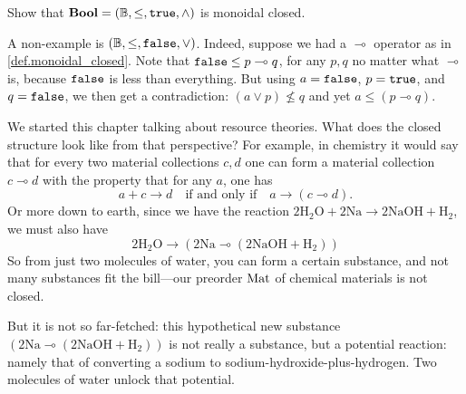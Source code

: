 \documentclass[7Sketches]{subfiles}
\begin{document}
\begin{exercise}%
\label{exc.Bool_monoidal_closed}%
%
Show that $\mathbf{Bool}=(\mathbb{B},\leq,\mathtt{true},\wedge)$ is monoidal closed.
\end{exercise}

\begin{example}
A non-example is $(\mathbb{B},\leq,\mathtt{false},\vee)$. Indeed, suppose we had a $\multimap$
operator as in \cref{def.monoidal_closed}. Note that $\mathtt{false}\leq p\multimap q$,
for any $p,q$ no matter what $\multimap$ is, because $\mathtt{false}$ is less than
everything. But using $a=\mathtt{false}$, $p=\mathtt{true}$, and $q=\mathtt{false}$, we then get
a contradiction: $(a\vee p)\not\leq q$ and yet $a\leq(p\multimap q)$.
\end{example}


\begin{example}%
We started this chapter talking about resource theories. What does the closed structure look like from that perspective? For example, in chemistry it would say that for every two material collections $c,d$ one can form a material collection $c\multimap d$ with the property that for any $a$, one has
\[a+c\to d\quad\text{if and only if}\quad a\to(c\multimap d).\]
Or more down to earth, since we have the reaction $\mathrm{2H_2O+2Na\to2NaOH+H_2}$, we must also have
\[\mathrm{2H_2O\to(2Na\multimap (2NaOH+H_2))}\]
So from just two molecules of water, you can form a certain substance, and not
many substances fit the bill---our preorder $\mathrm{Mat}$ of chemical materials is not closed. 

But it is not so far-fetched: this hypothetical new substance $\mathrm{(2Na\multimap (2NaOH+H_2))}$ is not really a substance, but a potential reaction: namely that of converting a sodium to sodium-hydroxide-plus-hydrogen. Two molecules of water unlock that potential.
%
\end{example}
\end{document}
